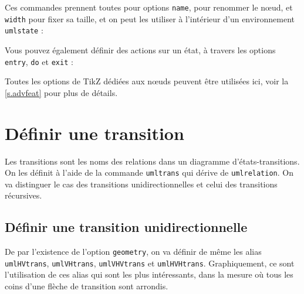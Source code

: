 \documentclass[a4paper,11pt]{report}
\newcommand{\inputTikZ}[1]{%
  }%
\newcommand{\inputTikZ}[1]{%
    \texttt{[image: fig/\#1.pdf]}%
  }%
\newcommand{\TikZ}{{\sc TikZ}}
\begin{document}
\medskip

Ces commandes prennent toutes pour options {\tt name}, pour renommer le n\oe{}ud, et {\tt width} pour fixer sa taille, et on peut les utiliser à l'intérieur d'un environnement {\tt umlstate} :

\medskip

\begin{minipage}{0.51\textwidth}

\end{minipage}
\begin{minipage}{0.49\textwidth}
\begin{center}
\inputTikZ{statename}
\end{center}
\end{minipage}

\medskip

Vous pouvez également définir des actions sur un état, à travers les options {\tt entry}, {\tt do} et {\tt exit} :

\medskip

\begin{minipage}{0.51\textwidth}

\end{minipage}
\begin{minipage}{0.49\textwidth}
\begin{center}
\inputTikZ{stateactions}
\end{center}
\end{minipage}

\medskip

Toutes les options de \TikZ{} dédiées aux n\oe{}uds peuvent être utilisées ici, voir la \autoref{s.advfeat} pour plus de détails.

\section{Définir une transition}\label{s.trans}

Les transitions sont les noms des relations dans un diagramme d'états-transitions. On les définit à l'aide de la commande {\tt umltrans} qui dérive de {\tt umlrelation}. On va distinguer le cas des transitions unidirectionnelles et celui des transitions récursives.

\subsection{Définir une transition unidirectionnelle}\label{s.unitrans}

De par l'existence de l'option {\tt geometry}, on va définir de même les alias {\tt umlHVtrans}, {\tt umlVHtrans}, {\tt umlVHVtrans} et {\tt umlHVHtrans}. Graphiquement, ce sont l'utilisation de ces alias qui sont les plus intéressants, dans la mesure où tous les coins d'une flèche de transition sont arrondis.
\end{document}
